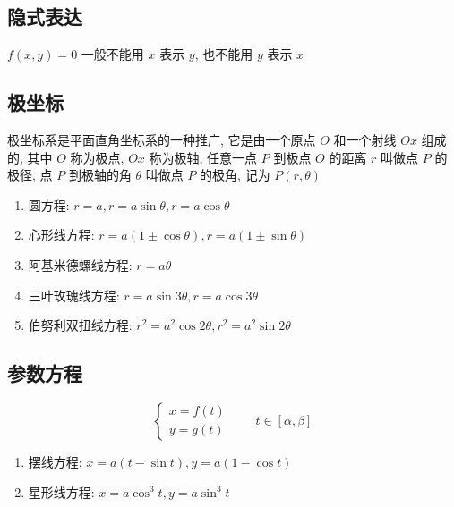 \subsection{隐式表达}
\begin{definition}[隐式表达]
	$f(x,y) = 0$ 一般不能用 $x$ 表示 $y$, 也不能用 $y$ 表示 $x$
\end{definition}
\subsection{极坐标}
\begin{definition}[极坐标]
	极坐标系是平面直角坐标系的一种推广, 它是由一个原点 $O$ 和一个射线 $Ox$ 组成的, 其中 $O$ 称为极点, $Ox$ 称为极轴, 
	任意一点 $P$ 到极点 $O$ 的距离 $r$ 叫做点 $P$ 的极径, 点 $P$ 到极轴的角 $\theta$ 叫做点 $P$ 的极角, 记为 $P(r,\theta)$
\end{definition}

\begin{definition}[重要极坐标方程]
	\begin{enumerate}
		\item 圆方程: $r = a, r = a\sin\theta, r = a\cos\theta$
		\item 心形线方程: $r = a(1\pm \cos\theta), r = a(1\pm \sin\theta)$
		\item 阿基米德螺线方程: $r = a\theta$
		\item 三叶玫瑰线方程: $r = a\sin 3\theta, r = a\cos 3\theta$
		\item 伯努利双扭线方程: $r^{2} = a^{2}\cos 2\theta, r^{2} = a^{2}\sin 2\theta$
	\end{enumerate}
\end{definition}
\subsection{参数方程}
\begin{definition}[参数方程]
	$$\begin{cases}
		x = f(t)\\
		y = g(t)
	\end{cases} \qquad t\in[\alpha,\beta]$$
\end{definition}
\begin{definition}[重要参数方程]
	\begin{enumerate}
		\item 摆线方程: $x = a(t-\sin t), y = a(1-\cos t)$
		\item 星形线方程: $x = a\cos^{3} t, y = a\sin^{3} t$
	\end{enumerate}
\end{definition}

